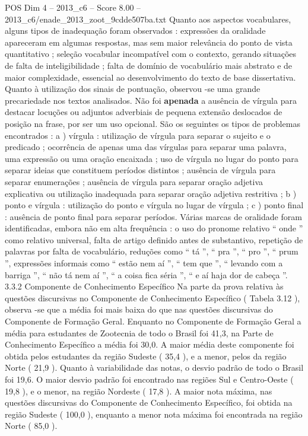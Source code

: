 \begin{textsample}{POS Dim 4 – 2013\_c6 – Score 8.00 – 2013\_c6/enade\_2013\_zoot\_9cdde507ba.txt}
Quanto aos aspectos vocabulares, alguns tipos de inadequação foram observados : expressões da oralidade apareceram em algumas respostas, mas sem maior relevância do ponto de vista quantitativo ; seleção vocabular incompatível com o contexto, gerando situações de falta de inteligibilidade ; falta de domínio de vocabulário mais abstrato e de maior complexidade, essencial ao desenvolvimento do texto de base dissertativa.
Quanto à utilização dos sinais de pontuação, observou -se uma grande precariedade nos textos analisados.
Não foi \textbf{apenada} a ausência de vírgula para destacar locuções ou adjuntos adverbiais de pequena extensão deslocados de posição na frase, por ser um uso opcional.
São os seguintes os tipos de problemas encontrados : a ) vírgula : utilização de vírgula para separar o sujeito e o predicado ; ocorrência de apenas uma das vírgulas para separar uma palavra, uma expressão ou uma oração encaixada ; uso de vírgula no lugar do ponto para separar ideias que constituem períodos distintos ; ausência de vírgula para separar enumerações ; ausência de vírgula para separar oração adjetiva explicativa ou utilização inadequada para separar oração adjetiva restritiva ; b ) ponto e vírgula : utilização do ponto e vírgula no lugar de vírgula ; c ) ponto final : ausência de ponto final para separar períodos.
Várias marcas de oralidade foram identificadas, embora não em alta frequência : o uso do pronome relativo “ onde ” como relativo universal, falta de artigo definido antes de substantivo, repetição de palavras por falta de vocabulário, reduções como “ tá ”, “ pra ”, “ pro ”, “ prum ”, expressões informais como “ estão nem aí ”, “ tem que ”, “ levando com a barriga ”, “ não tá nem aí ”, “ a coisa fica séria ”, “ e aí haja dor de cabeça ”. 3.3.2 Componente de Conhecimento Específico Na parte da prova relativa às questões discursivas no Componente de Conhecimento Específico ( Tabela 3.12 ), observa -se que a média foi mais baixa do que nas questões discursivas do Componente de Formação Geral.
Enquanto no Componente de Formação Geral a média para estudantes de Zootecnia de todo o Brasil foi 41,3, na Parte de Conhecimento Específico a média foi 30,0.
A maior média deste componente foi obtida pelos estudantes da região Sudeste ( 35,4 ), e a menor, pelos da região Norte ( 21,9 ).
Quanto à variabilidade das notas, o desvio padrão de todo o Brasil foi 19,6.
O maior desvio padrão foi encontrado nas regiões Sul e Centro-Oeste ( 19,8 ), e o menor, na região Nordeste ( 17,8 ).
A maior nota máxima, nas questões discursivas do Componente de Conhecimento Específico, foi obtida na região Sudeste ( 100,0 ), enquanto a menor nota máxima foi encontrada na região Norte ( 85,0 ).

\end{textsample}
